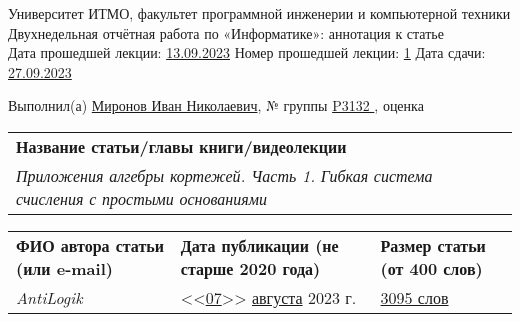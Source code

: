 \documentclass[12pt]{article}
\begin{document}
\begin{center}
\quad Университет ИТМО, факультет программной инженерии и компьютерной техники \\
\quad Двухнедельная отчётная работа по «Информатике»: аннотация к статье\\
\quad Дата прошедшей лекции: \underline{13.09.2023} 	Номер прошедшей лекции: \underline{1}	Дата сдачи: \underline{27.09.2023}

\bigskip

\quad Выполнил(а) \underline{Миронов Иван Николаевич}, № группы \underline{ P3132 }, оценка \underline{\hspace{2cm}}


\end{center}

\begin{tabularx}{\textwidth} { 
  | >{\raggedright\arraybackslash}X|}
    \hline
\textbf{Название статьи/главы книги/видеолекции}\\
    \textit{Приложения алгебры кортежей. Часть 1. Гибкая система счисления с простыми основаниями}\\
    \hline
\end{tabularx}

\begin{tabularx}{\textwidth} 
{ 
| >{\centering\arraybackslash}X
| >{\centering\arraybackslash}X
| >{\centering\arraybackslash}X 
|}
    \textbf{ФИО автора статьи \quad (или e-mail)} & \textbf{Дата публикации \qquad\qquad (не старше 2020 года)} & \textbf{Размер статьи \qquad\qquad (от 400 слов)} \\
     \textit{AntiLogik} & <<\underline{07}>> \underline{августа} 2023 г. & \underline{3095 слов} \\
    \hline
\end{tabularx}
\end{document}

